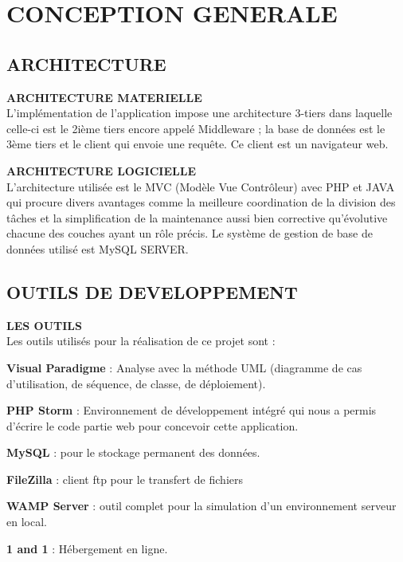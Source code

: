 \section{CONCEPTION GENERALE}

\subsection{ARCHITECTURE}

 \textbf{ARCHITECTURE MATERIELLE}\\
 
L’implémentation de l’application impose une architecture 3-tiers dans laquelle celle-ci est le 2ième tiers encore appelé Middleware ; la base de données est le 3ème tiers et le client qui envoie une requête. Ce client est un navigateur web.

 \textbf{ARCHITECTURE LOGICIELLE}\\
 
L’architecture utilisée est le MVC (Modèle Vue Contrôleur) avec PHP et JAVA qui procure divers avantages comme la meilleure coordination de la division des tâches et la simplification de la maintenance aussi bien corrective qu’évolutive chacune des couches ayant un rôle précis. Le système de gestion de base de données utilisé est MySQL SERVER.

\subsection{OUTILS DE DEVELOPPEMENT}

 \textbf{LES OUTILS}\\
 
Les outils utilisés pour la réalisation de ce projet sont :
\begin{list}{•}{ }
\item \textbf{Visual Paradigme} : Analyse avec la méthode UML (diagramme de cas d’utilisation, de séquence, de classe, de déploiement).
\item \textbf{PHP Storm} : Environnement de développement intégré qui nous a permis d’écrire le code partie web pour concevoir cette application. 
\item \textbf{MySQL} : pour le stockage permanent des données.
\item \textbf{FileZilla} : client ftp pour le transfert de fichiers
\item \textbf{WAMP Server} : outil complet pour la simulation d’un environnement serveur en local.   
\item \textbf{1 and 1 }: Hébergement en ligne.
\end{list}

